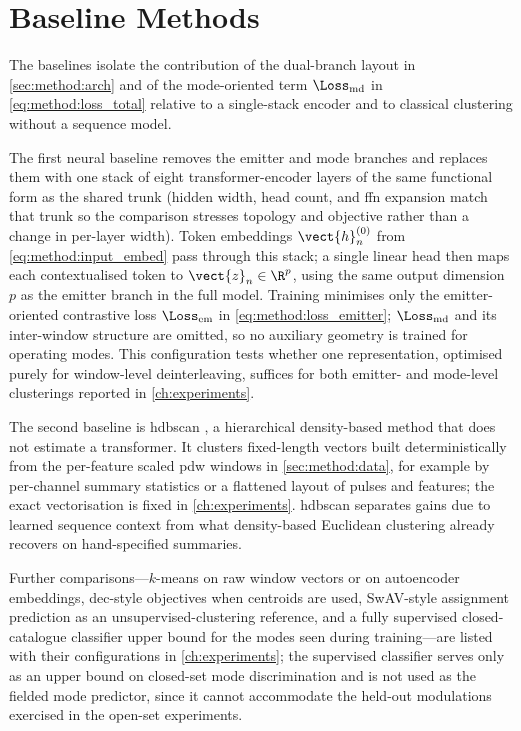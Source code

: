 \section{Baseline Methods}\label{sec:method:baselines}

The baselines isolate the contribution of the dual-branch layout in \cref{sec:method:arch} and of the mode-oriented term $\Loss_{\mathrm{md}}$ in \cref{eq:method:loss_total} relative to a single-stack encoder and to classical clustering without a sequence model.

The first neural baseline removes the emitter and mode branches and replaces them with one stack of eight transformer-encoder layers of the same functional form as the shared trunk (hidden width, head count, and \gls{ffn} expansion match that trunk so the comparison stresses topology and objective rather than a change in per-layer width).
Token embeddings $\vect{h}^{(0)}_n$ from \cref{eq:method:input_embed} pass through this stack; a single linear head then maps each contextualised token to $\vect{z}_n \in \R^{p}$, using the same output dimension $p$ as the emitter branch in the full model.
Training minimises only the emitter-oriented contrastive loss $\Loss_{\mathrm{em}}$ in \cref{eq:method:loss_emitter}; $\Loss_{\mathrm{md}}$ and its inter-window structure are omitted, so no auxiliary geometry is trained for operating modes.
This configuration tests whether one representation, optimised purely for window-level deinterleaving, suffices for both emitter- and mode-level clusterings reported in \cref{ch:experiments}.

The second baseline is \gls{hdbscan} \parencite{mcinnes2017hdbscan}, a hierarchical density-based method that does not estimate a transformer.
It clusters fixed-length vectors built deterministically from the per-feature scaled \gls{pdw} windows in \cref{sec:method:data}, for example by per-channel summary statistics or a flattened layout of pulses and features; the exact vectorisation is fixed in \cref{ch:experiments}.
\Gls{hdbscan} separates gains due to learned sequence context from what density-based Euclidean clustering already recovers on hand-specified summaries.

Further comparisons---$k$-means on raw window vectors or on autoencoder embeddings, \gls{dec}-style objectives when centroids are used, SwAV-style assignment prediction \parencite{caron2020swav} as an unsupervised-clustering reference, and a fully supervised closed-catalogue classifier upper bound for the modes seen during training---are listed with their configurations in \cref{ch:experiments}; the supervised classifier serves only as an upper bound on closed-set mode discrimination and is not used as the fielded mode predictor, since it cannot accommodate the held-out modulations exercised in the open-set experiments.
